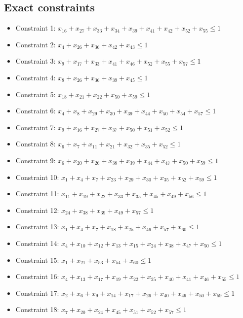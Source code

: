 \documentclass[11pt]{article}
\begin{document}
\subsection*{Exact constraints}
\begin{itemize}
\item Constraint 1: $x_{16} + x_{27} + x_{33} + x_{34} + x_{39} + x_{41} + x_{42} + x_{52} + x_{55} \le 1$
\item Constraint 2: $x_{4} + x_{26} + x_{36} + x_{42} + x_{43} \le 1$
\item Constraint 3: $x_{9} + x_{17} + x_{33} + x_{41} + x_{46} + x_{52} + x_{55} + x_{57} \le 1$
\item Constraint 4: $x_{8} + x_{26} + x_{36} + x_{39} + x_{45} \le 1$
\item Constraint 5: $x_{18} + x_{21} + x_{22} + x_{50} + x_{59} \le 1$
\item Constraint 6: $x_{4} + x_{8} + x_{29} + x_{30} + x_{39} + x_{44} + x_{50} + x_{54} + x_{57} \le 1$
\item Constraint 7: $x_{9} + x_{16} + x_{27} + x_{37} + x_{50} + x_{51} + x_{52} \le 1$
\item Constraint 8: $x_{6} + x_{7} + x_{11} + x_{21} + x_{32} + x_{35} + x_{52} \le 1$
\item Constraint 9: $x_{6} + x_{20} + x_{26} + x_{38} + x_{39} + x_{44} + x_{47} + x_{50} + x_{59} \le 1$
\item Constraint 10: $x_{1} + x_{4} + x_{7} + x_{23} + x_{29} + x_{30} + x_{35} + x_{52} + x_{59} \le 1$
\item Constraint 11: $x_{11} + x_{19} + x_{22} + x_{33} + x_{35} + x_{45} + x_{49} + x_{56} \le 1$
\item Constraint 12: $x_{24} + x_{38} + x_{39} + x_{49} + x_{57} \le 1$
\item Constraint 13: $x_{1} + x_{4} + x_{7} + x_{18} + x_{25} + x_{46} + x_{57} + x_{60} \le 1$
\item Constraint 14: $x_{4} + x_{10} + x_{12} + x_{13} + x_{15} + x_{24} + x_{38} + x_{47} + x_{50} \le 1$
\item Constraint 15: $x_{1} + x_{21} + x_{53} + x_{54} + x_{60} \le 1$
\item Constraint 16: $x_{4} + x_{13} + x_{17} + x_{19} + x_{22} + x_{25} + x_{40} + x_{41} + x_{46} + x_{55} \le 1$
\item Constraint 17: $x_{2} + x_{6} + x_{9} + x_{14} + x_{17} + x_{26} + x_{40} + x_{49} + x_{50} + x_{59} \le 1$
\item Constraint 18: $x_{7} + x_{20} + x_{24} + x_{45} + x_{51} + x_{52} + x_{57} \le 1$

\end{itemize}
\end{document}
